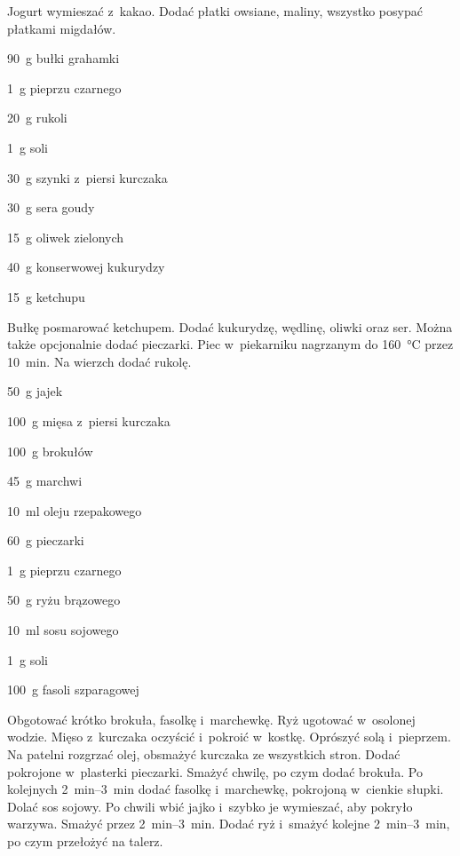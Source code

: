 \documentclass[../main.tex]{subfiles}
\begin{document}
Jogurt wymieszać z~kakao. Dodać płatki owsiane, maliny, wszystko posypać
płatkami migdałów.


\begin{Ingred}
    \item \qty{90}{\gram} bułki grahamki
    \item \qty{1}{\gram} pieprzu czarnego
    \item \qty{20}{\gram} rukoli
    \item \qty{1}{\gram} soli
    \item \qty{30}{\gram} szynki z~piersi kurczaka
    \item \qty{30}{\gram} sera goudy
    \item \qty{15}{\gram} oliwek zielonych
    \item \qty{40}{\gram} konserwowej kukurydzy
    \item \qty{15}{\gram} ketchupu
\end{Ingred}

Bułkę posmarować ketchupem. Dodać kukurydzę, wędlinę, oliwki oraz ser. Można
także opcjonalnie dodać pieczarki. Piec w~piekarniku nagrzanym do
\qty{160}{\celsius} przez \qty{10}{\minute}. Na wierzch dodać rukolę.


\begin{Ingred}
    \item \qty{50}{\gram} jajek
    \item \qty{100}{\gram} mięsa z~piersi kurczaka
    \item \qty{100}{\gram} brokułów
    \item \qty{45}{\gram} marchwi
    \item \qty{10}{\milli\litre} oleju rzepakowego
    \item \qty{60}{\gram} pieczarki
    \item \qty{1}{\gram} pieprzu czarnego
    \item \qty{50}{\gram} ryżu brązowego
    \item \qty{10}{\milli\litre} sosu sojowego
    \item \qty{1}{\gram} soli
    \item \qty{100}{\gram} fasoli szparagowej
\end{Ingred}

Obgotować krótko brokuła, fasolkę i~marchewkę. Ryż ugotować w~osolonej wodzie.
Mięso z~kurczaka oczyścić i~pokroić w~kostkę. Oprószyć solą i~pieprzem. Na
patelni rozgrzać olej, obsmażyć kurczaka ze wszystkich stron. Dodać pokrojone
w~plasterki pieczarki. Smażyć chwilę, po czym dodać brokuła. Po kolejnych
\qtyrange{2}{3}{\minute} dodać fasolkę i~marchewkę, pokrojoną w~cienkie słupki.
Dolać sos sojowy. Po chwili wbić jajko i~szybko je wymieszać, aby pokryło
warzywa. Smażyć przez \qtyrange{2}{3}{\minute}. Dodać ryż i~smażyć kolejne
\qtyrange{2}{3}{\minute}, po czym przełożyć na talerz.
\end{document}
